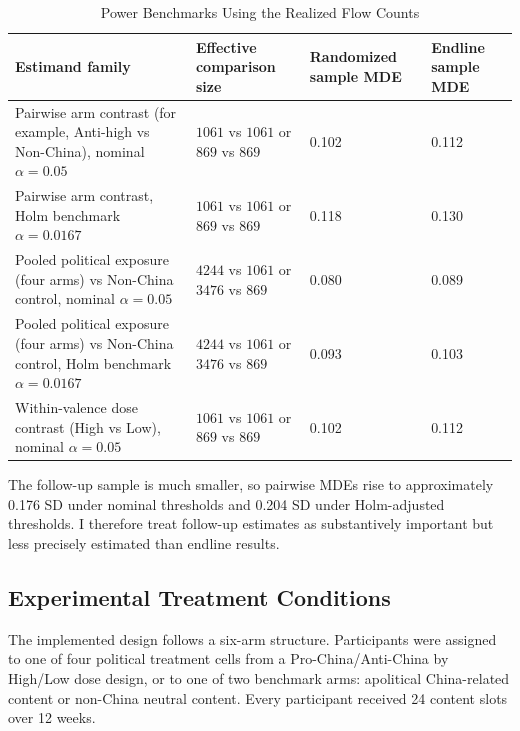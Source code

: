 \documentclass[12pt,american]{article}
\begin{document}
\begin{table}[H]
\centering
\caption{Power Benchmarks Using the Realized Flow Counts}
\label{tab:power_mde}
\footnotesize
\begin{tabularx}{\textwidth}{@{}L{0.41\textwidth}L{0.22\textwidth}L{0.17\textwidth}L{0.17\textwidth}@{}}
\toprule
Estimand family & Effective comparison size & Randomized sample MDE & Endline sample MDE \\
\midrule
Pairwise arm contrast (for example, Anti-high vs Non-China), nominal \(\alpha=0.05\) & \(1061\) vs \(1061\) or \(869\) vs \(869\) & 0.102 & 0.112 \\
Pairwise arm contrast, Holm benchmark \(\alpha=0.0167\) & \(1061\) vs \(1061\) or \(869\) vs \(869\) & 0.118 & 0.130 \\
Pooled political exposure (four arms) vs Non-China control, nominal \(\alpha=0.05\) & \(4244\) vs \(1061\) or \(3476\) vs \(869\) & 0.080 & 0.089 \\
Pooled political exposure (four arms) vs Non-China control, Holm benchmark \(\alpha=0.0167\) & \(4244\) vs \(1061\) or \(3476\) vs \(869\) & 0.093 & 0.103 \\
Within-valence dose contrast (High vs Low), nominal \(\alpha=0.05\) & \(1061\) vs \(1061\) or \(869\) vs \(869\) & 0.102 & 0.112 \\
\bottomrule
\end{tabularx}
\end{table}

The follow-up sample is much smaller, so pairwise MDEs rise to approximately 0.176 SD under nominal thresholds and 0.204 SD under Holm-adjusted thresholds. I therefore treat follow-up estimates as substantively important but less precisely estimated than endline results.

\subsection{Experimental Treatment Conditions}

The implemented design follows a six-arm structure. Participants were assigned to one of four political treatment cells from a Pro-China/Anti-China by High/Low dose design, or to one of two benchmark arms: apolitical China-related content or non-China neutral content. Every participant received 24 content slots over 12 weeks.
\end{document}
